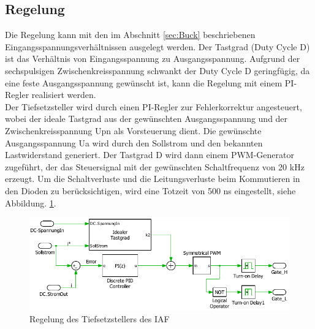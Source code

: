 	\subsection{Regelung}
	Die Regelung kann mit den im Abschnitt \ref{sec:Buck} beschriebenen Eingangsspannungsverhältnissen ausgelegt werden. Der Tastgrad (Duty Cycle \gls{D}) ist das Verhältnis von Eingangsspannung zu Ausgangsspannung. Aufgrund der sechspulsigen Zwischenkreisspannung schwankt der Duty Cycle \gls{D} geringfügig, da eine feste Ausgangsspannung gewünscht ist, kann die Regelung mit einem PI-Regler realisiert werden.\\
	Der Tiefsetzsteller wird durch einen PI-Regler zur Fehlerkorrektur angesteuert, wobei der ideale Tastgrad aus der gewünschten Ausgangsspannung und der Zwischenkreisspannung \gls{Upn} als Vorsteuerung dient. Die gewünschte Ausgangsspannung \gls{Ua} wird durch den Sollstrom und den bekannten Lastwiderstand generiert. Der Tastgrad \gls{D} wird dann einem PWM-Generator zugeführt, der das Steuersignal mit der gewünschten Schaltfrequenz von 20 kHz erzeugt. Um die Schaltverluste und die Leitungsverluste beim Kommutieren in den Dioden zu berücksichtigen, wird eine Totzeit von 500 \si{\nano \second} eingestellt, siehe Abbildung. \ref{fig:iafbuckcontrol}.
	\begin{figure}[H]
		\centering
		\includegraphics[width=1\linewidth]{content/Grafiken/IAF_BuckControl}
		\caption{Regelung des Tiefsetzstellers des IAF}
		\label{fig:iafbuckcontrol}
	\end{figure}



